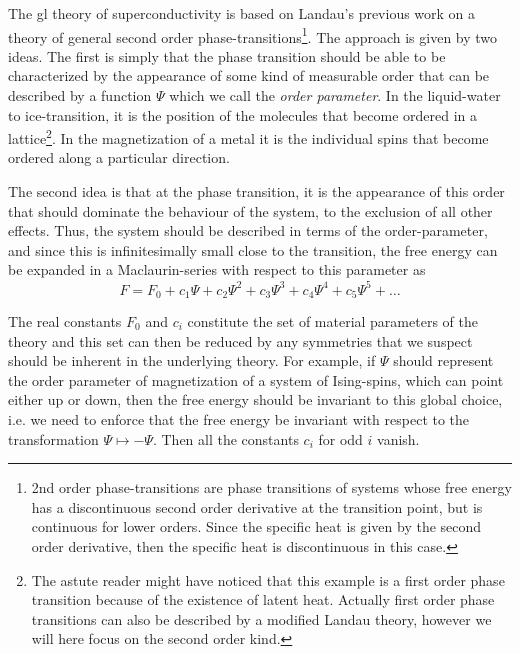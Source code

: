 The \ac{gl} theory of superconductivity is based on Landau's previous work on a theory of general second
order phase-transitions\footnote{2nd order phase-transitions are phase transitions of systems whose free energy
has a discontinuous second order derivative at the transition point, but is continuous for lower orders.
Since the specific heat is given by the second order derivative, then the specific heat is discontinuous in this case.}.
The approach is given by two ideas. The first is simply that the phase transition should be able to be characterized
by the appearance of some kind of measurable
order that can be described by a function $\Psi$ which we call the \emph{order parameter}. In the liquid-water to ice-transition,
it is the position of the molecules that become ordered in a lattice\footnote{The astute reader might have noticed that this
example is a first order phase transition because of the existence of latent heat. Actually first order phase transitions
can also be described by a modified Landau theory, however we will here focus on the second order kind.}.
In the magnetization of a metal it is the individual spins that become ordered along a particular direction.

The second idea is that at the phase transition, it is the appearance of this order that should dominate the behaviour
of the system, to the exclusion of all other effects. Thus, the system should be described in terms of the order-parameter,
and since this is infinitesimally small close to the transition, the free energy can be expanded in a Maclaurin-series
with respect to this parameter as
\begin{equation}
    \label{eq:statMech:LandauMaclaurin}
    F = F_0 + c_1 \Psi + c_2 \Psi^2 + c_3 \Psi^3 + c_4 \Psi^4 + c_5 \Psi^5 + \ldots
\end{equation}

The real constants $F_0$ and $c_i$ constitute the set of material parameters of the theory and this set can then
be reduced by any symmetries that we suspect should be inherent in the underlying theory. For example, if $\Psi$
should represent the order parameter of magnetization of a system of Ising-spins, which can point either up or
down, then the free energy should be invariant to this global choice, i.e. we need to enforce that the free energy
be invariant with respect to the transformation $\Psi \mapsto -\Psi$. Then all the constants $c_i$ for odd $i$
vanish.

